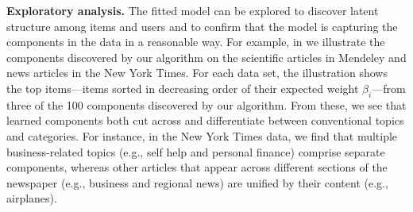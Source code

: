 


{\bf Exploratory analysis.} The fitted model can be explored to
discover latent structure among items and users and to confirm that
the model is capturing the components in the data in a reasonable
way. For example, in  we illustrate the components
discovered by our algorithm on the scientific articles in Mendeley and
news articles in the New York Times. For each data set, the
illustration shows the top items---items sorted in decreasing order of
their expected weight $\beta_i$---from three of the 100 components
discovered by our algorithm. From these, we see that learned
components both cut across and differentiate between conventional
topics and categories. For instance, in the New York Times data, we find
that multiple business-related topics (e.g., self help and personal
finance) comprise separate components, whereas other articles that
appear across different sections of the newspaper (e.g., business and
regional news) are unified by their content (e.g., airplanes). 


